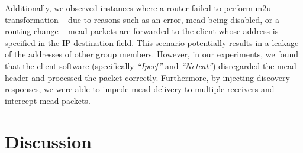 Additionally, we observed instances where a router failed to perform \gls{m2u}
    transformation -- due to reasons such as an error, \gls{mead} being
    disabled, or a routing change -- \gls{mead} packets are forwarded to the
    client whose address is specified in the IP destination field.
This scenario potentially results in a leakage of the addresses of other
    group members.
However, in our experiments, we found that the client software (specifically
    \textit{``Iperf''} and \textit{``Netcat''}) disregarded the \gls{mead}
    header and processed the packet correctly.
Furthermore, by injecting discovery responses, we were able to impede
    \gls{mead} delivery to multiple receivers and intercept \gls{mead} packets. 


\section{Discussion} %
\label{sec:Discussion}











